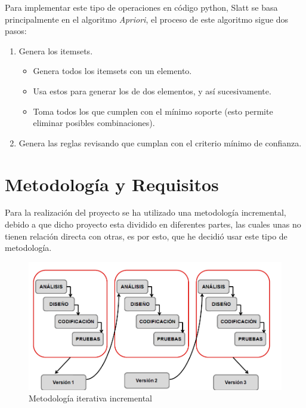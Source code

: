 \documentclass{cosas/tfg_domingo}
\begin{document}
Para implementar este tipo de operaciones en código python, Slatt se basa principalmente en el algoritmo \textit{Apriori}, el proceso de este algoritmo sigue dos pasos: \citep{morales2013reglas}

\begin{enumerate}
    \item Genera los itemsets.
    \begin{itemize}
        \item Genera todos los itemsets con un elemento.
        \item Usa estos para generar los de dos elementos, y así sucesivamente.
        \item Toma todos los que cumplen con el mínimo soporte (esto permite eliminar posibles combinaciones).
    \end{itemize}
    \item Genera las reglas revisando que cumplan con el criterio mínimo de confianza.
\end{enumerate}







\newpage
\section{Metodología y Requisitos}

Para la realización del proyecto se ha utilizado una metodología incremental, debido a que dicho proyecto esta dividido en diferentes partes, las cuales unas no tienen relación directa con otras, es por esto, que he decidió usar este tipo de metodología.

\begin{figure}[ht!] %
\begin{center}
\includegraphics[width=.7\linewidth]{imagenes/Metodologia.png}
\end{center}
\caption{Metodología iterativa incremental}
\label{fig_pro}
\end{figure}
\end{document}
